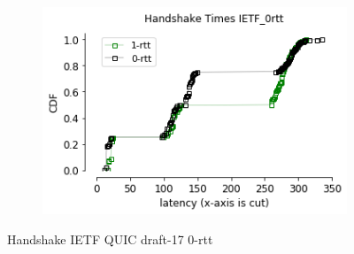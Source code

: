\begin{frame}

%

\begin{figure}[!t]
    \centering
    \begin{subfigure}{0.5\textwidth}
        \includegraphics[width=\linewidth]
        {./plots/VM/ietf/handshake_times_ietf_0rtt.png}
    \end{subfigure}
    \caption{\label{fig:handshake_times_0rtt_ipv4}Handshake IETF QUIC draft-17 0-rtt}
\end{figure}

\end{frame}
\clearpage

